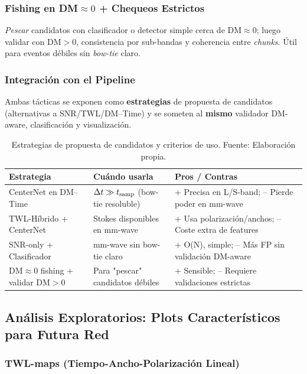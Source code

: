 \subsubsection{Fishing en DM$\approx 0$ + Chequeos Estrictos}

\textit{Pescar} candidatos con clasificador o detector simple cerca de DM$\approx 0$; luego validar con DM$>0$, consistencia por sub-bandas y coherencia entre \emph{chunks}. Útil para eventos débiles sin \textit{bow-tie} claro.

\subsubsection{Integración con el Pipeline}

Ambas tácticas se exponen como \textbf{estrategias} de propuesta de candidatos (alternativas a SNR/TWL/DM--Time) y se someten al \textbf{mismo} validador DM-aware, clasificación y visualización.

\begin{table}[h] 
\centering 
\caption{\label{tab:estrategias} Estrategias de propuesta de candidatos y criterios de uso. Fuente: Elaboración propia.} 
\begin{tabular}{p{} p{} p{}} 
\toprule 
\textbf{Estrategia} & \textbf{Cuándo usarla} & \textbf{Pros / Contras} \\ 
\midrule 
CenterNet en DM--Time & $\Delta t \gg t_{\rm samp}$ (bow-tie resoluble) & + Precisa en L/S-band; -- Pierde poder en mm-wave \\ 
TWL-Híbrido + CenterNet & Stokes disponibles en mm-wave & + Usa polarización/anchos; -- Coste extra de features \\ 
SNR-only + Clasificador & mm-wave sin bow-tie claro & + O(N), simple; -- Más FP sin validación DM-aware \\ 
DM$\approx 0$ fishing + validar DM$>0$ & Para "pescar" candidatos débiles & + Sensible; -- Requiere validaciones estrictas \\ 
\bottomrule 
\end{tabular} 
\end{table}

\subsection{Análisis Exploratorios: Plots Característicos para Futura Red}

\subsubsection{TWL-maps (Tiempo-Ancho-Polarización Lineal)}

